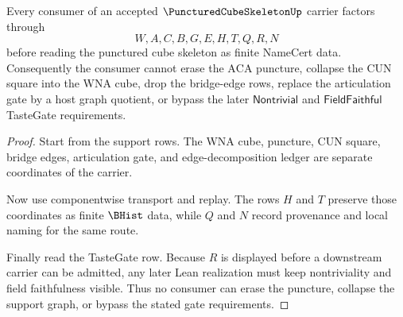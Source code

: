 \begin{theorem}
\label{thm:punctured-cube-skeleton-boundary-nonescape}
Every consumer of an accepted $\PuncturedCubeSkeletonUp$ carrier factors through
$$
W,A,C,B,G,E,H,T,Q,R,N
$$
before reading the punctured cube skeleton as finite NameCert data. Consequently the consumer cannot erase the $\mathrm{ACA}$ puncture, collapse the CUN square into the WNA cube, drop the bridge-edge rows, replace the articulation gate by a host graph quotient, or bypass the later $\mathsf{Nontrivial}$ and $\mathsf{FieldFaithful}$ TasteGate requirements.
\end{theorem}
\begin{proof}
Start from the support rows. The WNA cube, puncture, CUN square, bridge edges, articulation gate, and edge-decomposition ledger are separate coordinates of the carrier.

Now use componentwise transport and replay. The rows $H$ and $T$ preserve those coordinates as finite $\BHist$ data, while $Q$ and $N$ record provenance and local naming for the same route.

Finally read the TasteGate row. Because $R$ is displayed before a downstream carrier can be admitted, any later Lean realization must keep nontriviality and field faithfulness visible. Thus no consumer can erase the puncture, collapse the support graph, or bypass the stated gate requirements.
\end{proof}

